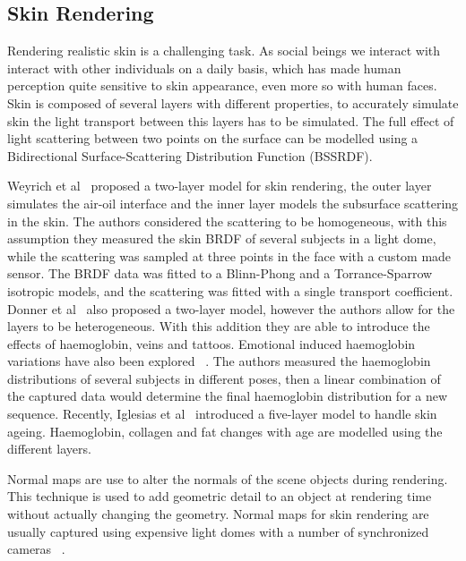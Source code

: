 \documentclass[11pt]{article}
\begin{document}
\subsection{Skin Rendering}

Rendering realistic skin is a challenging task.
As social beings we interact with interact with other individuals on a daily basis, which has made human perception quite sensitive to skin appearance, even more so with human faces.
Skin is composed of several layers with different properties, to accurately simulate skin the light transport between this layers has to be simulated.
The full effect of light scattering between two points on the surface can be modelled using a Bidirectional Surface-Scattering Distribution Function (BSSRDF).

Weyrich et al~\cite{Weyrich2006} proposed a two-layer model for skin rendering, the outer layer simulates the air-oil interface and the inner layer models the subsurface scattering in the skin.
The authors considered the scattering to be homogeneous, with this assumption they measured the skin BRDF of several subjects in a light dome, while the scattering was sampled at three points in the face with a custom made sensor.
The BRDF data was fitted to a Blinn-Phong and a Torrance-Sparrow isotropic models, and the scattering was fitted with a single transport coefficient.
Donner et al~\cite{Donner2008} also proposed a two-layer model, however the authors allow for the layers to be heterogeneous.
With this addition they are able to introduce the effects of haemoglobin, veins and tattoos.
Emotional induced haemoglobin variations have also been explored ~\cite{Jimenez2010}.
The authors measured the haemoglobin distributions of several subjects in different poses, then a linear combination of the captured data would determine the final haemoglobin distribution for a new sequence.
Recently, Iglesias et al~\cite{Iglesias2015} introduced a five-layer model to handle skin ageing.
Haemoglobin, collagen and fat changes with age are modelled using the different layers.

Normal maps are use to alter the normals of the scene objects during rendering.
This technique is used to add geometric detail to an object at rendering time without actually changing the geometry.
Normal maps for skin rendering are usually captured using expensive light domes with a number of synchronized cameras ~\cite{Graham2013, Weyrich2006}. 
\end{document}

